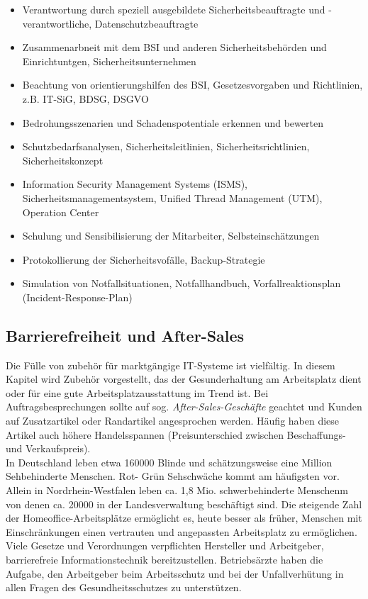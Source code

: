 \documentclass[a4paper, 12pt]{report}
\begin{document}
\begin{itemize}
    \item Verantwortung durch speziell ausgebildete Sicherheitsbeauftragte und 
    -verantwortliche, Datenschutzbeauftragte
    \item Zusammenarbneit mit dem BSI und anderen Sicherheitsbehörden und 
    Einrichtuntgen, Sicherheitsunternehmen
    \item Beachtung von orientierungshilfen des BSI, Gesetzesvorgaben und 
    Richtlinien, z.B. IT-SiG, BDSG, DSGVO
    \item Bedrohungsszenarien und Schadenspotentiale erkennen und bewerten
    \item  Schutzbedarfsanalysen, Sicherheitsleitlinien, Sicherheitsrichtlinien, 
    Sicherheitskonzept
    \item Information Security Management Systems (ISMS), 
    Sicherheitsmanagementsystem, Unified Thread Management (UTM), Operation 
    Center
    \item Schulung und Sensibilisierung der Mitarbeiter, Selbsteinschätzungen
    \item Protokollierung der Sicherheitsvofälle, Backup-Strategie
    \item Simulation von Notfallsituationen, Notfallhandbuch, 
    Vorfallreaktionsplan (Incident-Response-Plan)
\end{itemize}

\subsection{Barrierefreiheit und After-Sales}

Die Fülle von zubehör für marktgängige IT-Systeme ist vielfältig. In diesem 
Kapitel wird Zubehör vorgestellt, das der Gesunderhaltung am Arbeitsplatz dient 
oder für eine gute Arbeitsplatzausstattung im Trend ist. Bei 
Auftragsbesprechungen sollte auf sog. \emph{After-Sales-Geschäfte} geachtet und 
Kunden auf Zusatzartikel oder Randartikel angesprochen werden. Häufig haben 
diese Artikel auch höhere Handelsspannen (Preisunterschied zwischen 
Beschaffungs- und Verkaufspreis). \\

In Deutschland leben etwa 160000 Blinde und schätzungsweise eine Million 
Sehbehinderte Menschen. Rot- Grün Sehschwäche kommt am häufigsten vor. Allein 
in Nordrhein-Westfalen leben ca. 1,8 Mio. schwerbehinderte Menschenm von denen
ca. 20000 in der Landesverwaltung beschäftigt sind. Die steigende Zahl der 
Homeoffice-Arbeitsplätze  ermöglicht es, heute besser als früher, Menschen mit 
Einschränkungen einen vertrauten und angepassten Arbeitsplatz zu ermöglichen. 
Viele Gesetze und Verordnungen verpflichten Hersteller und Arbeitgeber, 
barrierefreie Informationstechnik bereitzustellen. Betriebsärzte haben die 
Aufgabe, den Arbeitgeber beim Arbeitsschutz und bei der Unfallverhütung in allen 
Fragen des Gesundheitsschutzes zu unterstützen. 
\end{document}
